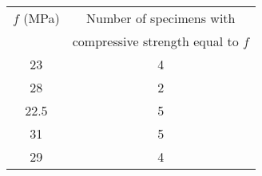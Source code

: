 \begin{tabular}{cc}
    \toprule
        \( f \) (MPa) & Number of specimens with \\
                      & compressive strength equal to \( f \) \\
        \midrule
        23   & 4 \\
        28   & 2 \\
        22.5 & 5 \\
        31   & 5 \\
        29   & 4 \\
        \bottomrule
    \end{tabular}
